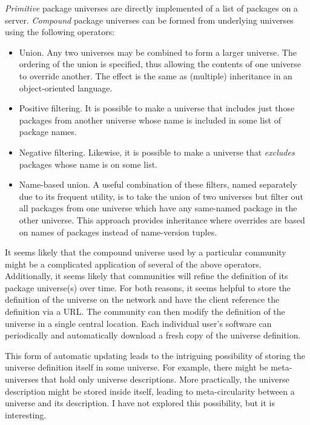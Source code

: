 \documentclass{article}
\begin{document}
\emph{Primitive} package universes are directly implemented of a list
of packages on a server.  \emph{Compound} package universes can be
formed from underlying universes using the following operators:
\begin{itemize}
\item Union.  Any two universes may be combined to form a larger
      universe.  The ordering of the union is specified, thus allowing
      the contents of one universe to override another.  The effect
      is the same as (multiple) inheritance in an object-oriented language.

\item Positive filtering.  It is possible to make a universe that
      includes just those packages from another universe whose
      name is included in some list of package names.

\item Negative filtering.  Likewise, it is possible to make a universe
      that \emph{excludes} packages whose name is on some list.

\item Name-based union.  A useful combination of these filters, named
      separately due to its frequent utility, is to take the union of
      two universes but filter out all packages from one universe
      which have any same-named package in the other universe.  This
      approach provides inheritance where overrides are based on names
      of packages instead of name-version tuples.
\end{itemize}


It seems likely that the compound universe used by a particular
community might be a complicated application of several of the above
operators.  Additionally, it seems likely that communities will refine
the definition of its package universe(s) over time.  For both
reasons, it seems helpful to store the definition of the universe on
the network and have the client reference the definition via a URL.
The community can then modify the definition of the universe in a
single central location.  Each individual user's software can
periodically and automatically download a fresh copy of the universe
definition.

This form of automatic updating leads to the intriguing possibility of
storing the universe definition itself in some universe.  For example,
there might be meta-universes that hold only universe descriptions.
More practically, the universe description might be stored inside
itself, leading to meta-circularity between a universe and its
description.  I have not explored this possibility, but it is
interesting.
\end{document}
